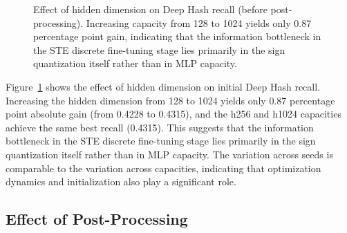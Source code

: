 \documentclass[11pt,a4paper]{article}
\begin{document}
\begin{figure}[htbp]
\centering
{}
\caption{Effect of hidden dimension on Deep Hash recall (before post-processing). Increasing capacity from 128 to 1024 yields only 0.87 percentage point gain, indicating that the information bottleneck in the STE discrete fine-tuning stage lies primarily in the sign quantization itself rather than in MLP capacity.}
\label{fig:capacity}
\end{figure}

Figure~\ref{fig:capacity} shows the effect of hidden dimension on initial Deep Hash recall. Increasing the hidden dimension from 128 to 1024 yields only 0.87 percentage point absolute gain (from 0.4228 to 0.4315), and the h256 and h1024 capacities achieve the same best recall (0.4315). This suggests that the information bottleneck in the STE discrete fine-tuning stage lies primarily in the sign quantization itself rather than in MLP capacity. The variation across seeds is comparable to the variation across capacities, indicating that optimization dynamics and initialization also play a significant role.

\subsection{Effect of Post-Processing}
\end{document}
